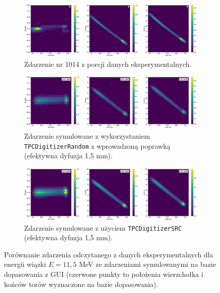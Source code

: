 \documentclass{article}
\begin{document}
\begin{figure}[htbp]
    \centering
    \begin{subfigure}[b]{\textwidth}
        \centering
         \includegraphics[width=\textwidth, trim={0cm 0cm 0cm 0cm},clip]{img/event1014_real.png}
         \caption{Zdarzenie nr 1014 z porcji danych eksperymentalnych.}
         \label{fig:real}
    \end{subfigure}
    \begin{subfigure}[b]{\textwidth}
         \centering
         \includegraphics[width=\textwidth, trim={0cm 0cm 0cm 0cm},clip]{img/event1014_sim_1_5.png}
         \caption{Zdarzenie symulowane z wykorzystaniem \texttt{TPCDigitizerRandom} z wprowadzoną poprawką (efektywna dyfuzja 1,5 mm).}
         \label{fig:sim1}
    \end{subfigure}
    \begin{subfigure}[b]{\textwidth}
         \centering
         \includegraphics[width=\textwidth, trim={0cm 0cm 0cm 0cm},clip]{img/event1014_simSRC.png}
         \caption{Zdarzenie symulowane z użyciem \texttt{TPCDigitizerSRC} (efektywna dyfuzja 1,5 mm).}
         \label{fig:sim2}
    \end{subfigure}
    \caption{Porównanie zdarzenia odczytanego z danych eksperymentalnych dla energii wiązki $E=11,5$ MeV ze zdarzeniami symulowanymi na bazie dopasowania z GUI (czerwone punkty to położenia wierzchołka i końców torów wyznaczone na bazie dopasowania).}
    \label{fig:porownanie}
\end{figure}
 
\end{document}
